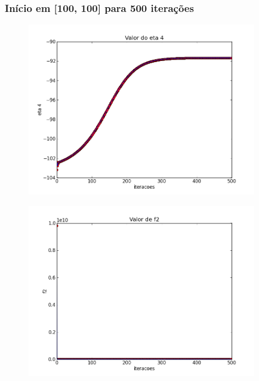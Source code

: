 \documentclass[12pt]{article}
\begin{document}
\clearpage
\subsubsection{Início em [100, 100] para 500 iterações}
\mbox{}

\begin{figure}[!h]
\begin{center}
\includegraphics[width=10cm]{100_100_eta_4.png}
\end{center}
\end{figure}

\begin{figure}[!h]
\begin{center}
\includegraphics[width=10cm]{100_100_f_2.png}
\end{center}
\end{figure}
\end{document}

